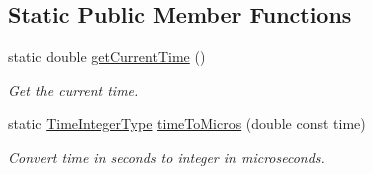 \subsection*{Static Public Member Functions}
\begin{DoxyCompactItemize}
\item 
static double \hyperlink{structvt_1_1trace_1_1_trace_a04cf6b76b4ced1bc90d246a34c948db5}{get\+Current\+Time} ()
\begin{DoxyCompactList}\small\item\em Get the current time. \end{DoxyCompactList}\item 
static \hyperlink{structvt_1_1trace_1_1_trace_ab8db9218a8ab87f59773fcbf81433787}{Time\+Integer\+Type} \hyperlink{structvt_1_1trace_1_1_trace_a4f271a172e5b1d3bfe7f61d9443b9146}{time\+To\+Micros} (double const time)
\begin{DoxyCompactList}\small\item\em Convert time in seconds to integer in microseconds. \end{DoxyCompactList}\end{DoxyCompactItemize}
